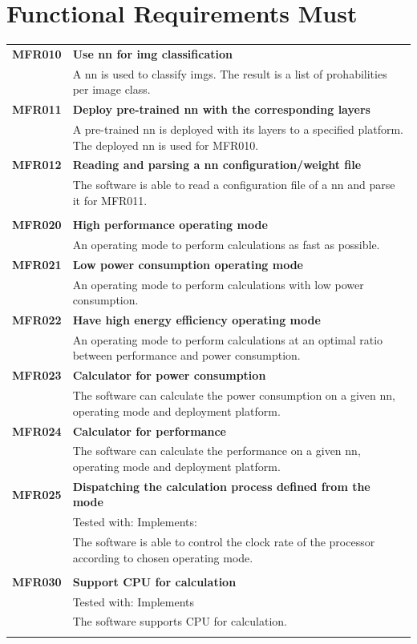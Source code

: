 \documentclass[parskip=full]{scrartcl}
\begin{document}
\section{Functional Requirements Must}
\begin{tabular}{p{2cm}p{12cm}}
\textbf{MFR010} & \textbf{Use \gls{nn} for \gls{img} classification}\\                                     
& A \gls{nn} is used to classify \glspl{img}. The result is a list of prohabilities per image class.\\
\textbf{MFR011} & \textbf{Deploy pre-trained \gls{nn} with the corresponding layers}\\
& A pre-trained \gls{nn} is deployed with its layers to a specified platform. The deployed \gls{nn} is used for MFR010.\\
\textbf{MFR012} & \textbf{Reading and parsing a \gls{nn} configuration/weight file}\\
& The software is able to read a configuration file of a \gls{nn} and parse it for MFR011.\\
& \\
\textbf{MFR020} & \textbf{High performance operating mode}\\                                     
& An operating mode to perform calculations as fast as possible.\\
\textbf{MFR021} & \textbf{Low power consumption operating mode}\\                                     
& An operating mode to perform calculations with low power consumption.\\
\textbf{MFR022} & \textbf{Have high energy efficiency operating mode}\\                                     
& An operating mode to perform calculations at an optimal ratio between performance and power consumption.\\
\textbf{MFR023} & \textbf{Calculator for power consumption}\\                                     
& The software can calculate the power consumption on a given \gls{nn}, operating mode and deployment platform.\\
\textbf{MFR024} & \textbf{Calculator for performance}\\                                     
& The software can calculate the performance on a given \gls{nn}, operating mode and deployment platform.\\
\textbf {MFR025} & \textbf{Dispatching the calculation process defined from the mode}\\
& Tested with: Implements: \\
& The software is able to control the clock rate of the processor according to chosen operating mode. \\
& \\
\textbf {MFR030} & \textbf{Support CPU for calculation} \\
& Tested with: Implements \\
& The software supports CPU for calculation. \\
& \\
\end{tabular}
\end{document}
